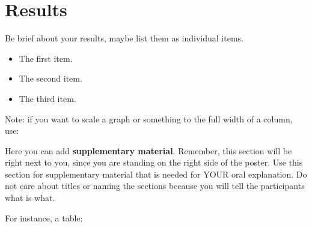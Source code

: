 \documentclass[a0paper,fleqn,landscape]{betterposter}
\begin{document}
{\section{Results}

Be brief about your results, maybe list them as individual items. 

\begin{itemize}
\item The first item.
\item The second item.
\item The third item.
\end{itemize}


\vspace*{3.0em}

Note: if you want to scale a graph or something to the full width of a column, use: 




}{

Here you can add \textbf{supplementary material}. Remember, this section will be 
right next to you, since you are standing on the right side of the poster. 
Use this section for supplementary material that is needed for YOUR oral 
explanation. Do not care about titles or naming the sections because you will 
tell the participants what is what.


\vspace*{3.0em}

For instance, a table:


\vspace*{3.0em}

}
\end{document}

